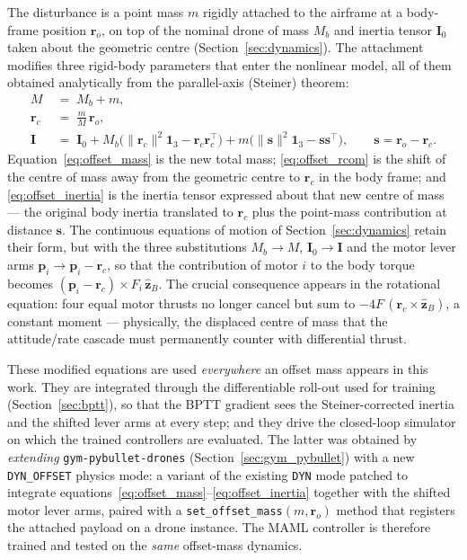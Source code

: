\documentclass[11pt,a4paper]{article}
\theoremstyle{remark}
\numberwithin{equation}{section}
\begin{document}
The disturbance is a point mass $m$ rigidly attached to the airframe at a
body-frame position $\mathbf{r}_o$, on top of the nominal drone of mass $M_b$
and inertia tensor $\mathbf{I}_0$ taken about the geometric centre
(Section~\ref{sec:dynamics}). The attachment modifies three rigid-body
parameters that enter the nonlinear model, all of them obtained analytically
from the parallel-axis (Steiner) theorem:
\begin{align}
    M           \;&=\; M_b + m,
    \label{eq:offset_mass}\\
    \mathbf{r}_c \;&=\; \frac{m}{M}\,\mathbf{r}_o,
    \label{eq:offset_rcom}\\
    \mathbf{I}  \;&=\; \mathbf{I}_0
        + M_b\bigl(\|\mathbf{r}_c\|^2 \mathbf{1}_3 - \mathbf{r}_c\mathbf{r}_c^\top\bigr)
        + m\bigl(\|\mathbf{s}\|^2 \mathbf{1}_3 - \mathbf{s}\mathbf{s}^\top\bigr),
    \qquad \mathbf{s} = \mathbf{r}_o - \mathbf{r}_c.
    \label{eq:offset_inertia}
\end{align}
Equation~\eqref{eq:offset_mass} is the new total mass;
\eqref{eq:offset_rcom} is the shift of the centre of mass away from the
geometric centre to $\mathbf{r}_c$ in the body frame; and
\eqref{eq:offset_inertia} is the inertia tensor expressed about that new
centre of mass --- the original body inertia translated to $\mathbf{r}_c$
plus the point-mass contribution at distance $\mathbf{s}$. The continuous
equations of motion of Section~\ref{sec:dynamics} retain their form, but
with the three substitutions $M_b\!\to\!M$, $\mathbf{I}_0\!\to\!\mathbf{I}$
and the motor lever arms $\mathbf{p}_i\!\to\!\mathbf{p}_i-\mathbf{r}_c$, so
that the contribution of motor $i$ to the body torque becomes
$(\mathbf{p}_i-\mathbf{r}_c)\times F_i\,\hat{\mathbf{z}}_B$. The crucial
consequence appears in the rotational equation: four equal motor thrusts no
longer cancel but sum to $-4F\,(\mathbf{r}_c \times \hat{\mathbf{z}}_B)$, a
constant moment --- physically, the displaced centre of mass that the
attitude/rate cascade must permanently counter with differential thrust.

These modified equations are used \emph{everywhere} an offset mass appears
in this work. They are integrated through the differentiable roll-out used
for training (Section~\ref{sec:bptt}), so that the BPTT gradient sees the
Steiner-corrected inertia and the shifted lever arms at every step; and they
drive the closed-loop simulator on which the trained controllers are
evaluated. The latter was obtained by \emph{extending}
\texttt{gym-pybullet-drones} (Section~\ref{sec:gym_pybullet}) with a new
\texttt{DYN\_OFFSET} physics mode: a variant of the existing \texttt{DYN}
mode patched to integrate equations~\eqref{eq:offset_mass}--\eqref{eq:offset_inertia}
together with the shifted motor lever arms, paired with a
\texttt{set\_offset\_mass}$(m,\mathbf{r}_o)$ method that registers the
attached payload on a drone instance. The MAML controller is therefore
trained and tested on the \emph{same} offset-mass dynamics.
\end{document}
